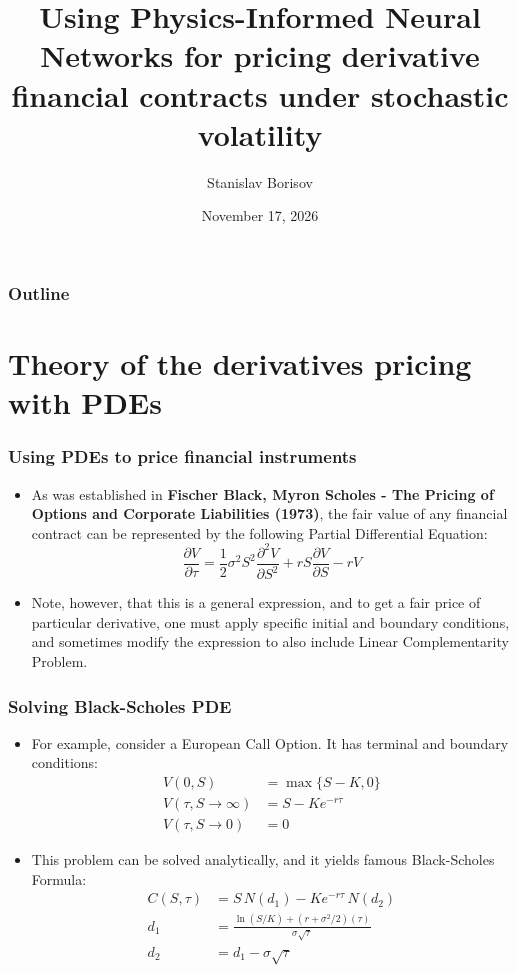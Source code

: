 \documentclass{beamer}
\title[PINNs for derivatives pricing]{Using Physics-Informed Neural Networks for pricing derivative financial contracts under stochastic volatility}
\author{Stanislav Borisov}
\institute[HSE University]{HSE University, MIPT, Sber}
\date{November 17, 2026}
\begin{document}
\frame{\titlepage}

\begin{frame}
\frametitle{Outline}
\tableofcontents
\end{frame}

\section{Theory of the derivatives pricing with PDEs}

\begin{frame}
\frametitle{Using PDEs to price financial instruments}
\begin{itemize}
    \item As was established in \textbf{Fischer Black, Myron Scholes - The Pricing of Options and Corporate Liabilities (1973)}, the fair value of any financial contract can be represented by the following Partial Differential Equation:
    \begin{equation*}
        \frac{\partial V}{\partial \tau}=\frac{1}{2}\sigma^2S^2\frac{\partial^2 V}{\partial S^2}+rS\frac{\partial V}{\partial S}-rV
    \end{equation*}
    \item Note, however, that this is a general expression, and to get a fair price of particular derivative, one must apply specific initial and boundary conditions, and sometimes modify the expression to also include Linear Complementarity Problem.
\end{itemize}
\end{frame}

\begin{frame}
\frametitle{Solving Black-Scholes PDE}
\begin{itemize}
    \item For example, consider a European Call Option. It has terminal and boundary conditions:
        \begin{align*}
            V(0, S) &= \max\{S-K, 0\} \\
            V(\tau, S\to\infty) &= S - Ke^{-r\tau} \\
            V(\tau, S\to0) &= 0
        \end{align*}
    \item This problem can be solved analytically, and it yields famous Black-Scholes Formula:
        \begin{align*}
            C(S, \tau) &= S \, N(d_1) - K e^{-r\tau} \, N(d_2) \\
            d_1 &= \frac{\ln\!\left(S/K\right) + \left(r + \sigma^2/2\right)(\tau)}{\sigma \sqrt{\tau}} \\
            d_2 &= d_1 - \sigma \sqrt{\tau}
        \end{align*}
\end{itemize}
\end{frame}
\end{document}
